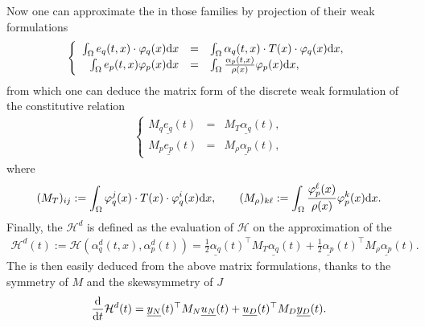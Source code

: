 \documentclass[letterpaper,10pt,english]{sphinxmanual}
\begin{document}
\sphinxAtStartPar
Now one can approximate the  in those families
by projection of their weak formulations
\begin{equation*}
\begin{split}\left\lbrace
\begin{array}{rcl}
\int_\Omega e_q(t,x) \cdot \varphi_q(x) {\rm d}x &=& \int_\Omega \alpha_q(t,x) \cdot T(x) \cdot \varphi_q(x) {\rm d}x, \\
\int_\Omega e_p(t,x) \varphi_p(x) {\rm d}x &=&  \int_\Omega \frac{\alpha_p(t,x)}{\rho(x)} \varphi_p(x) {\rm d}x,
\end{array}
\right.\end{split}
\end{equation*}
\sphinxAtStartPar
from which one can deduce the matrix form of the discrete weak
formulation of the constitutive relation
\begin{equation*}
\begin{split}\left\lbrace
\begin{array}{rcl}
M_q \underline{e_q}(t) &=& M_T \underline{\alpha_q}(t), \\
M_p \underline{e_p}(t) &=& M_\rho \underline{\alpha_p}(t),
\end{array}
\right.\end{split}
\end{equation*}
\sphinxAtStartPar
where
\begin{equation}\label{equation:examples/wave:weak-form-matrices-3}
\begin{split}   (M_T)_{ij} := \int_\Omega \varphi_q^j(x) \cdot T(x) \cdot \varphi_q^i(x) {\rm d}x,
   \qquad
   (M_\rho)_{k\ell} := \int_\Omega \frac{\varphi_p^\ell(x)}{\rho(x)} \varphi_p^k(x) {\rm d}x.\end{split}
\end{equation}
\sphinxAtStartPar
Finally, the  \(\mathcal{H}^d\) is defined
as the evaluation of \(\mathcal{H}\) on the approximation of the
\begin{equation*}
\begin{split}\mathcal{H}^d(t) := \mathcal{H}(\alpha_q^d(t,x), \alpha_p^d(t)) = \frac{1}{2} \underline{\alpha_q}(t)^\top M_T \underline{\alpha_q}(t) + \frac{1}{2} \underline{\alpha_p}(t)^\top M_\rho \underline{\alpha_p}(t).\end{split}
\end{equation*}
\sphinxAtStartPar
The  is then easily deduced from the above
matrix formulations, thanks to the symmetry of \(M\) and the
skew\sphinxhyphen{}symmetry of \(J\)
\begin{equation*}
\begin{split}\frac{\rm d}{{\rm d}t} \mathcal{H}^d(t) = \underline{y_N}(t)^\top M_N \underline{u_N}(t) + \underline{u_D}(t)^\top M_D \underline{y_D}(t).\end{split}
\end{equation*}
\end{document}
